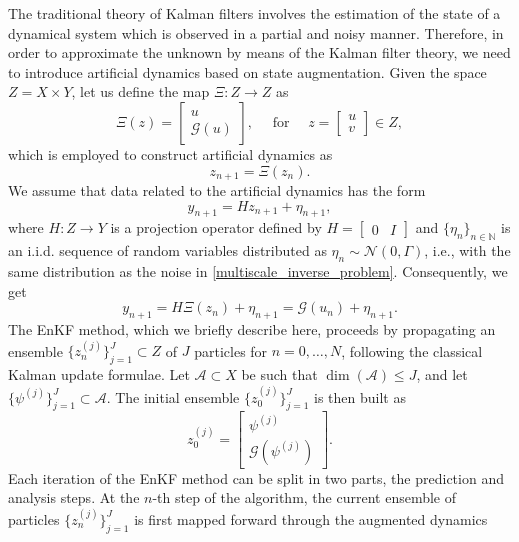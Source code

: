The traditional theory of Kalman filters involves the estimation of the state of a dynamical system which is observed in a partial and noisy manner. Therefore, in order to approximate the unknown by means of the Kalman filter theory, we need to introduce artificial dynamics based on state augmentation. Given the space $Z = X \times Y$, let us define the map $\Xi \colon Z \to Z$ as
\begin{equation}
	\Xi(z) = \begin{bmatrix} u \\ \mathcal G(u) \end{bmatrix}, \quad \text{ for } \quad z = \begin{bmatrix} u \\ v \end{bmatrix} \in Z,
\end{equation}
which is employed to construct artificial dynamics as
\begin{equation}\label{artificial_dynamics}
	z_{n+1} = \Xi(z_n).
\end{equation}
We assume that data related to the artificial dynamics has the form
\[ y_{n+1} = H z_{n+1} + \eta_{n+1}, \]
where $H \colon Z \to Y$ is a projection operator defined by $H = \begin{bmatrix} 0 & I \end{bmatrix}$ and $\{\eta_n \}_{n \in \mathbb{N}}$ is an i.i.d. sequence of random variables distributed as $\eta_n \sim \mathcal{N}(0,\Gamma)$, i.e., with the same distribution as the noise in \eqref{multiscale_inverse_problem}. Consequently, we get
\[ y_{n+1} = H \Xi(z_n) + \eta_{n+1} = \mathcal G(u_n) + \eta_{n+1}. \]
The EnKF method, which we briefly describe here, proceeds by propagating an ensemble $\{ z_n^{(j)} \}_{j = 1}^J \subset Z$ of $J$ particles for $n = 0, \ldots, N$, following the classical Kalman update formulae. Let $\mathcal A \subset X$ be such that $\dim(\mathcal A) \leq J$, and let $\{ \psi^{(j)} \}_{j = 1}^J \subset \mathcal A$. The initial ensemble $\{ z_0^{(j)} \}_{j = 1}^J$ is then built as
\begin{equation*}
z_0^{(j)} = \begin{bmatrix} \psi^{(j)} \\ \mathcal G(\psi^{(j)}) \end{bmatrix}.
\end{equation*}
Each iteration of the EnKF method can be split in two parts, the prediction and analysis steps. At the $n$-th step of the algorithm, the current ensemble of particles $\{ z_n^{(j)} \}_{j=1}^J$ is first mapped forward through the augmented dynamics
